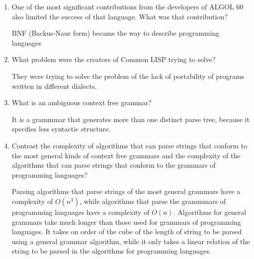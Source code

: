 \begin{enumerate}
\begin{answer}
    \end{answer}


  \item One of the most significant contributions from the developers
    of ALGOL 60 also limited the success of that language. What was
    that contribution?

  \begin{answer}

    BNF (Backus-Naur form) became the way to describe programming 
	languages

    \end{answer}

  \item What problem were the creators of Common LISP trying to solve?

  \begin{answer}

    They were trying to solve the problem of the lack of portability
    of programs written in different dialects.

    \end{answer}

  \item What is an ambiguous context free grammar?

  \begin{answer}

    It is a grammmar that generates more than one distinct parse tree,
    because it specifies less syntactic structure.

    \end{answer}

  \item Contrast the complexity of algorithms that can parse strings
    that conform to the most general kinds of context free grammars
    and the complexity of the algorithms that can parse strings that
    conform to the grammars of programming languages?

  \begin{answer}

    Parsing algorithms that parse strings of the most general grammars
    have a complexity of $O(n^3)$, while algorithms that parse the
    grammmars of programming languages have a complexity of
    $O(n)$. Algorithms for general grammars take much longer than those
    used for grammars of programming languages. It takes on order of
    the cube of the length of string to be parsed using a general
    grammar algorithm, while it only takes a linear relation of the
    string to be parsed in the algorithms for programming languages.


\end{answer}
\end{enumerate}
